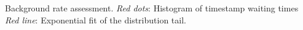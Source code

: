 Background rate assessment. \textit{Red dots}: Histogram of timestamp waiting times
\textit{Red line}: Exponential fit of the distribution tail.
\label{fig:bgdist}